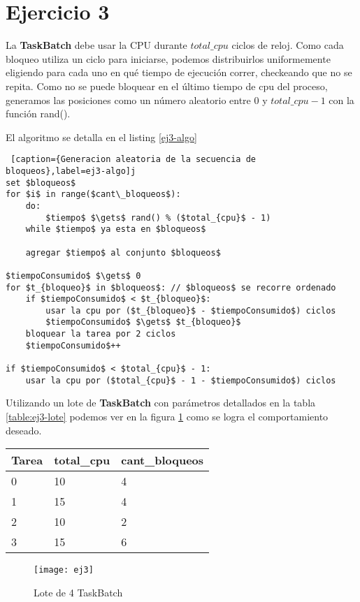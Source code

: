 \section{Ejercicio 3}

La \textbf{TaskBatch} debe usar la CPU durante $total\_cpu$ ciclos de reloj.
Como cada bloqueo utiliza un ciclo para iniciarse, podemos distribuirlos uniformemente
eligiendo para cada uno en qué tiempo de ejecución correr, checkeando que no se repita.
Como no se puede bloquear en el último tiempo de cpu del proceso, generamos las
posiciones como un número aleatorio entre $0$ y $total\_cpu - 1$ con la función
\textsf{rand()}.

El algoritmo se detalla en el listing \ref{ej3-algo}

\begin{lstlisting} [caption={Generacion aleatoria de la secuencia de bloqueos},label=ej3-algo]j
set $bloqueos$
for $i$ in range($cant\_bloqueos$):
    do:
        $tiempo$ $\gets$ rand() % ($total_{cpu}$ - 1)
    while $tiempo$ ya esta en $bloqueos$

    agregar $tiempo$ al conjunto $bloqueos$

$tiempoConsumido$ $\gets$ 0
for $t_{bloqueo}$ in $bloqueos$: // $bloqueos$ se recorre ordenado
    if $tiempoConsumido$ < $t_{bloqueo}$:
        usar la cpu por ($t_{bloqueo}$ - $tiempoConsumido$) ciclos
        $tiempoConsumido$ $\gets$ $t_{bloqueo}$
    bloquear la tarea por 2 ciclos
    $tiempoConsumido$++

if $tiempoConsumido$ < $total_{cpu}$ - 1:
    usar la cpu por ($total_{cpu}$ - 1 - $tiempoConsumido$) ciclos

\end{lstlisting}

Utilizando un lote de \textbf{TaskBatch} con parámetros detallados en la tabla \ref{table:ej3-lote}
podemos ver en la figura \ref{fig:ej3} como se logra el comportamiento deseado.

\begin{center}
    \begin{tabular}{| l | l | l |}
        \hline
        Tarea & total\_cpu & cant\_bloqueos \\ \hline
        0 & 10 & 4 \\
        1 & 15 & 4 \\
        2 & 10 & 2 \\
        3 & 15 & 6 \\
        \hline
    \end{tabular}
    \label{table:ej3-lote}
\end{center}

\begin{figure}[H]
    \centering
    \texttt{[image: ej3]}
    \caption{Lote de 4 TaskBatch}
    \label{fig:ej3}
\end{figure}

